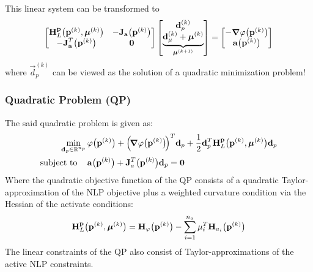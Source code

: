 			This linear system can be transformed to
			\begin{align*}
				\begin{bmatrix}
					\boldsymbol{\mathrm{H}}_L^{\boldsymbol{\mathrm{p}}}\big(\boldsymbol{\mathrm{p}}^{(k)}, \boldsymbol{\mathrm{\mu}}^{(k)}\big) & -\boldsymbol{\mathrm{J}}_{\boldsymbol{\mathrm{a}}}\big(\boldsymbol{\mathrm{p}}^{(k)}\big) \\
					-\boldsymbol{\mathrm{J}}_{\boldsymbol{\mathrm{a}}}^T\big(\boldsymbol{\mathrm{p}}^{(k)}\big) & \boldsymbol{\mathrm{0}}
				\end{bmatrix}
				\begin{bmatrix}
					\boldsymbol{\mathrm{d}}_p^{(k)} \\
					\underbrace{\boldsymbol{\mathrm{d}}_\mu^{(k)} + \boldsymbol{\mathrm{\mu}}^{(k)}}_{\boldsymbol{\mathrm{\mu}}^{(k + 1)}}
				\end{bmatrix}
				=
				\begin{bmatrix}
					-\grad{\varphi}\big(\boldsymbol{\mathrm{p}}^{(k)}\big) \\
					\boldsymbol{\mathrm{a}}\big(\boldsymbol{\mathrm{p}}^{(k)}\big)
				\end{bmatrix}
			\end{align*}
			where \( \vec{d}_p^{(k)} \) can be viewed as the solution of a quadratic minimization problem!

			\subsubsection{Quadratic Problem (QP)}
				The said quadratic problem is given as:
				\begin{align*}
					\min_{\boldsymbol{\mathrm{d}}_p \in \mathbb{R}^{n_p}} &\, \varphi\big(\boldsymbol{\mathrm{p}}^{(k)}\big) + \Big(\!\grad{\varphi}\big(\boldsymbol{\mathrm{p}}^{(k)}\big)\!\Big)^T \boldsymbol{\mathrm{d}}_p + \frac{1}{2} \boldsymbol{\mathrm{d}}_p^T \boldsymbol{\mathrm{H}}_L^{\boldsymbol{\mathrm{p}}}\big(\boldsymbol{\mathrm{p}}^{(k)}, \boldsymbol{\mathrm{\mu}}^{(k)}\big) \boldsymbol{\mathrm{d}}_p \\
					\mathrm{subject~to}\quad &\, \boldsymbol{\mathrm{a}}\big(\boldsymbol{\mathrm{p}}^{(k)}\big) + \boldsymbol{\mathrm{J}}_a^T\big(\boldsymbol{\mathrm{p}}^{(k)}\big) \boldsymbol{\mathrm{d}}_p = \boldsymbol{\mathrm{0}}
				\end{align*}
				Where the quadratic objective function of the QP consists of a quadratic Taylor-approximation of the NLP objective plus a weighted curvature condition via the Hessian of the activate conditions:
				\begin{align*}
					\boldsymbol{\mathrm{H}}_L^{\boldsymbol{\mathrm{p}}}\big(\boldsymbol{\mathrm{p}}^{(k)}, \boldsymbol{\mathrm{\mu}}^{(k)}\big) = \boldsymbol{\mathrm{H}}_\varphi\big(\boldsymbol{\mathrm{p}}^{(k)}\big) - \sum_{i = 1}^{n_a} \mu_i^T \boldsymbol{\mathrm{H}}_{a_i}\big(\boldsymbol{\mathrm{p}}^{(k)}\big)
				\end{align*}
				The linear constraints of the QP also consist of Taylor-approximations of the active NLP constraints.
				
